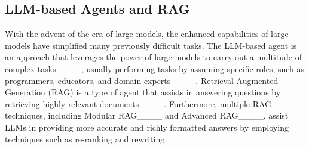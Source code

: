 \subsection{LLM-based Agents and RAG}
With the advent of the era of large models, the enhanced capabilities of large models have simplified many previously difficult tasks. The LLM-based agent is an approach that leverages the power of large models to carry out a multitude of complex tasks____, usually performing tasks by assuming specific roles, such as programmers, educators, and domain experts____. Retrieval-Augmented Generation (RAG) is a type of agent that assists in answering questions by retrieving highly relevant documents____. Furthermore, multiple RAG techniques, including Modular RAG____ and Advanced RAG____, assist LLMs in providing more accurate and richly formatted answers by employing techniques such as re-ranking and rewriting.

